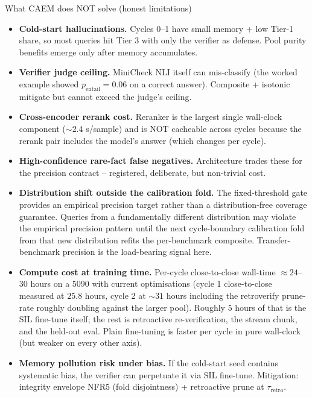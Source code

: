 \documentclass[10pt,aspectratio=169]{beamer}
\begin{document}
\begin{frame}{What CAEM does NOT solve (honest limitations)}
  \scriptsize
  \begin{itemize}
    \item \textbf{Cold-start hallucinations.} Cycles 0--1 have small memory + low Tier-1 share, so most queries hit Tier 3 with only the verifier as defense. Pool purity benefits emerge only after memory accumulates.
    \item \textbf{Verifier judge ceiling.} MiniCheck NLI itself can mis-classify (the worked example showed $p_{\text{entail}} = 0.06$ on a correct answer). Composite + isotonic mitigate but cannot exceed the judge's ceiling.
    \item \textbf{Cross-encoder rerank cost.} Reranker is the largest single wall-clock component ($\sim$2.4 s/sample) and is NOT cacheable across cycles because the rerank pair includes the model's answer (which changes per cycle).
    \item \textbf{High-confidence rare-fact false negatives.} Architecture trades these for the precision contract -- registered, deliberate, but non-trivial cost.
    \item \textbf{Distribution shift outside the calibration fold.} The fixed-threshold gate provides an empirical precision target rather than a distribution-free coverage guarantee. Queries from a fundamentally different distribution may violate the empirical precision pattern until the next cycle-boundary calibration fold from that new distribution refits the per-benchmark composite. Transfer-benchmark precision is the load-bearing signal here.
    \item \textbf{Compute cost at training time.} Per-cycle close-to-close wall-time $\approx 24$--$30$ hours on a 5090 with current optimisations (cycle 1 close-to-close measured at $25.8$ hours, cycle 2 at $\sim 31$ hours including the retroverify prune-rate roughly doubling against the larger pool). Roughly $5$ hours of that is the SIL fine-tune itself; the rest is retroactive re-verification, the stream chunk, and the held-out eval. Plain fine-tuning is faster per cycle in pure wall-clock (but weaker on every other axis).
    \item \textbf{Memory pollution risk under bias.} If the cold-start seed contains systematic bias, the verifier can perpetuate it via SIL fine-tune. Mitigation: integrity envelope NFR5 (fold disjointness) + retroactive prune at $\tau_{\text{retro}}$.
  \end{itemize}
\end{frame}
\end{document}
